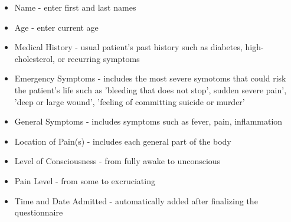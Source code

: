 \documentclass[letterpaper]{article}
\begin{document}
\begin{itemize}
\item Name - enter first and last names
\item Age - enter current age
\item Medical History - usual patient's past history such as diabetes, high-cholesterol, or recurring symptoms
\item Emergency Symptoms - includes the most severe symotoms that could risk the patient's life such as 'bleeding that does not stop', sudden severe pain', 'deep or large wound', 'feeling of committing suicide or murder'
\item General Symptoms - includes symptoms such as fever, pain, inflammation
\item Location of Pain(s) - includes each general part of the body 
\item Level of Consciousness - from fully awake to unconscious
\item Pain Level - from some to excruciating
\item Time and Date Admitted - automatically added after finalizing the questionnaire
\end{itemize}
\end{document}
